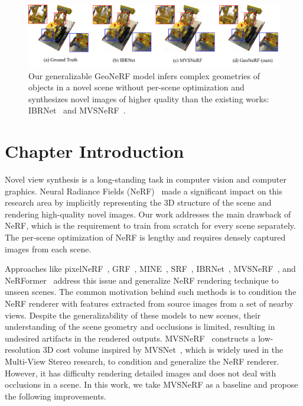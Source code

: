 \begin{figure}[t]
    \begin{center}
        \includegraphics[width=1.0\linewidth]{images/chapter3/figures/intro.jpg}
    \end{center}
   \caption{Our generalizable GeoNeRF model infers complex geometries of objects in a novel scene without per-scene optimization and synthesizes novel images of higher quality than the existing works: IBRNet~\citep{wang2021ibrnet} and MVSNeRF~\citep{chen2021mvsnerf}.}
\end{figure}

\section{Chapter Introduction}

Novel view synthesis is a long-standing task in computer vision and computer graphics. Neural Radiance Fields (NeRF)~\citep{mildenhall2020nerf} made a significant impact on this research area by implicitly representing the 3D structure of the scene and rendering high-quality novel images. Our work addresses the main drawback of NeRF, which is the requirement to train from scratch for every scene separately. The per-scene optimization of NeRF is lengthy and requires densely captured images from each scene.

Approaches like pixelNeRF~\citep{yu2021pixelnerf}, GRF~\citep{trevithick2021grf}, MINE~\citep{li2021mine}, SRF~\citep{chibane2021stereo}, IBRNet~\citep{wang2021ibrnet}, MVSNeRF~\citep{chen2021mvsnerf}, and NeRFormer~\citep{reizenstein2021common} address this issue and generalize NeRF rendering technique to unseen scenes. The common motivation behind such methods is to condition the NeRF renderer with features extracted from source images from a set of nearby views. Despite the generalizability of these models to new scenes, their understanding of the scene geometry and occlusions is limited, resulting in undesired artifacts in the rendered outputs. MVSNeRF~\citep{chen2021mvsnerf} constructs a low-resolution 3D cost volume inspired by MVSNet~\citep{yao2018mvsnet}, which is widely used in the Multi-View Stereo research, to condition and generalize the NeRF renderer. However, it has difficulty rendering detailed images and does not deal with occlusions in a scene. In this work, we take MVSNeRF as a baseline and propose the following improvements.


